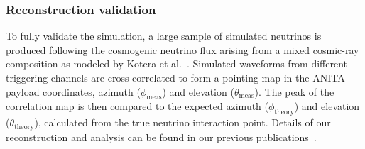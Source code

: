\subsubsection{Reconstruction validation}
\label{subsec:ANITA_validation_reconstruction}
To fully validate the simulation, a large sample of simulated
neutrinos is produced following the cosmogenic neutrino flux arising from a mixed cosmic-ray composition as modeled by Kotera et al.~\cite{kotera}.
Simulated waveforms from different triggering channels are
cross-correlated to form a pointing map in the ANITA payload
coordinates, azimuth ($\phi_{\mathrm{meas}}$) and elevation
($\theta_{\mathrm{meas}}$). 
The peak of the correlation map is then compared to the expected
azimuth ($\phi_{\mathrm{theory}}$) and elevation
($\theta_{\mathrm{theory}}$), calculated from the true neutrino interaction point.
Details of our reconstruction and analysis can be found in our
previous publications~\cite{ANITA1paper,ANITA2paper,romero2015interferometric}.






